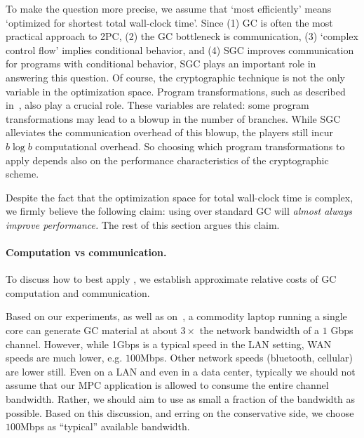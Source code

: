 To make the question more precise, we assume that `most efficiently' means
`optimized for shortest total wall-clock time'.
Since
(1) GC is often the most practical approach to 2PC,
(2) the GC bottleneck is communication,
(3) `complex control flow' implies conditional behavior, and
(4) SGC improves communication for programs with conditional behavior,
SGC plays an important role in answering this question.
%
Of course, the cryptographic technique is not the only variable
in the optimization space.
Program transformations, such as described
in~, also play a crucial role.
%
These variables are related:
some program transformations may lead to a blowup in the number of
branches.
While SGC alleviates the communication overhead of this blowup, the
players still incur $b \log b$ computational overhead.
%
So choosing which program transformations to apply depends also on the
performance characteristics of the cryptographic scheme.

Despite the fact that the optimization space for total wall-clock time
is complex, we firmly believe the following claim:
using \ourschemelong over standard GC will \emph{almost always improve
  performance.}
The rest of this section argues this claim.

\paragraph{Computation vs communication.} 
To discuss how to best apply \ourschemelong, we establish
approximate relative costs of GC computation and communication. 

 Based
on our experiments, as well as on~\cite{XiaoPersonalComm}, a commodity
laptop running a single core can generate GC material at about $3\times$ the
network bandwidth of a $1$ Gbps channel.  
However, while 1Gbps is a typical speed in the LAN setting, WAN
speeds are much lower, e.g. $100$Mbps.  Other network speeds
(bluetooth, cellular) are lower still.
Even on a LAN and even in a data center, typically we should
not assume that our MPC application is allowed to consume the entire
channel bandwidth. Rather, we should aim to use as small a fraction of
the bandwidth as possible.  Based on this discussion, and erring on
the conservative side,  we choose $100$Mbps as
``typical'' available bandwidth.
%

